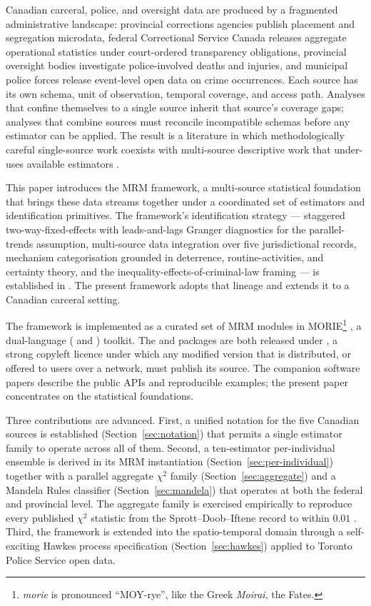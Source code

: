\documentclass[article,shortnames,nojss]{jss}
\begin{document}
Canadian carceral, police, and oversight data are produced by a
fragmented administrative landscape: provincial corrections agencies
publish placement and segregation microdata, federal Correctional
Service Canada releases aggregate operational statistics under
court-ordered transparency obligations, provincial oversight bodies
investigate police-involved deaths and injuries, and municipal
police forces release event-level open data on crime occurrences.
Each source has its own schema, unit of observation, temporal
coverage, and access path. Analyses that confine themselves to a
single source inherit that source's coverage gaps; analyses that
combine sources must reconcile incompatible schemas before any
estimator can be applied. The result is a literature in which
methodologically careful single-source work coexists with
multi-source descriptive work that under-uses available estimators
\citep{Doob2023, ZorroMedina2023JMP, SprottDoob2023}.

This paper introduces the MRM framework,
a multi-source statistical foundation that brings these data streams
together under a coordinated set of estimators and identification
primitives. The framework's identification strategy --- staggered
two-way-fixed-effects with leads-and-lags Granger diagnostics for the
parallel-trends assumption, multi-source data integration over five
jurisdictional records, mechanism categorisation grounded in
deterrence, routine-activities, and certainty theory, and the
inequality-effects-of-criminal-law framing --- is established in
\citet{ZorroMedina2023JMP}. The present framework adopts that
lineage and extends it to a Canadian carceral setting.

The framework is implemented as a curated set of MRM modules in
MORIE\footnote{\textit{morie} is pronounced ``MOY-rye'',
like the Greek \textit{Moirai}, the Fates.}
\citep{Ruhela2026MorieR, Ruhela2026MoriePy}, a dual-language
( and ) toolkit.  The 
and  packages are both released under
, a strong copyleft licence under which
any modified version that is distributed, or offered to users
over a network, must publish its source.  The
companion software papers describe the public
APIs and reproducible examples; the present paper concentrates on
the statistical foundations.

Three contributions are advanced. First, a unified notation for the
five Canadian sources is established
(Section~\ref{sec:notation}) that permits a single estimator family
to operate across all of them. Second, a ten-estimator
per-individual ensemble is derived in its MRM instantiation
(Section~\ref{sec:per-individual}) together with a parallel
aggregate $\chi^{2}$ family (Section~\ref{sec:aggregate}) and a
Mandela Rules classifier (Section~\ref{sec:mandela}) that operates
at both the federal and provincial level. The aggregate family is
exercised empirically to reproduce every published $\chi^{2}$
statistic from the Sprott--Doob--Iftene record to within $0.01$
\citep{SprottDoob2023, SprottDoobIftene2021}. Third, the framework is
extended into the spatio-temporal domain through a self-exciting
Hawkes process specification (Section~\ref{sec:hawkes}) applied to
Toronto Police Service open data.
\end{document}
